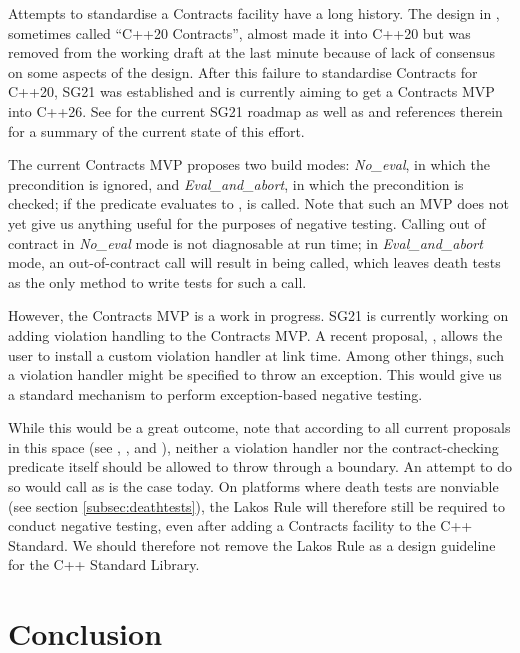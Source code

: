 Attempts to standardise a Contracts facility have a long history. The design in \cite{P0542R5}, sometimes called ``C++20 Contracts'', almost made it into C++20 but was removed from the working draft at the last minute because of lack of consensus on some aspects of the design. After this failure to standardise Contracts for C++20, SG21 was established and is currently aiming to get a Contracts MVP into C++26. See \cite{P2695R1} for the current SG21 roadmap as well as \cite{P2521R3} and references therein for a summary of the current state of this effort.

The current Contracts MVP proposes two build modes: \emph{No_eval}, in which the precondition is ignored, and \emph{Eval_and_abort}, in which the precondition is checked; if the predicate evaluates to ,  is called. Note that such an MVP does not yet give us anything useful for the purposes of negative testing. Calling  out of contract in \emph{No_eval} mode is not diagnosable at run time; in \mbox{\emph{Eval_and_abort}} mode, an out-of-contract call will result in  being called, which leaves death tests as the only method to write tests for such a call.

However, the Contracts MVP is a work in progress. SG21 is currently working on adding violation handling to the Contracts MVP. A recent proposal,  \cite{P2811R3}, allows the user to install a custom violation handler at link time. Among other things, such a violation handler might be specified to throw an exception. This would give us a standard mechanism to perform exception-based negative testing.

While this would be a great outcome, note that according to all current proposals in this space (see \cite{P2698R0}, \cite{P2811R3}, and \cite{P2834R0}), neither a violation handler nor the contract-checking predicate itself should be allowed to throw through a  boundary. An attempt to do so would call  as is the case today. On platforms where death tests are nonviable (see section \ref{subsec:deathtests}), the Lakos Rule will therefore still be required to conduct negative testing, even after adding a Contracts facility to the C++ Standard. We should therefore not remove the Lakos Rule as a design guideline for the C++ Standard Library.

\section{Conclusion}


